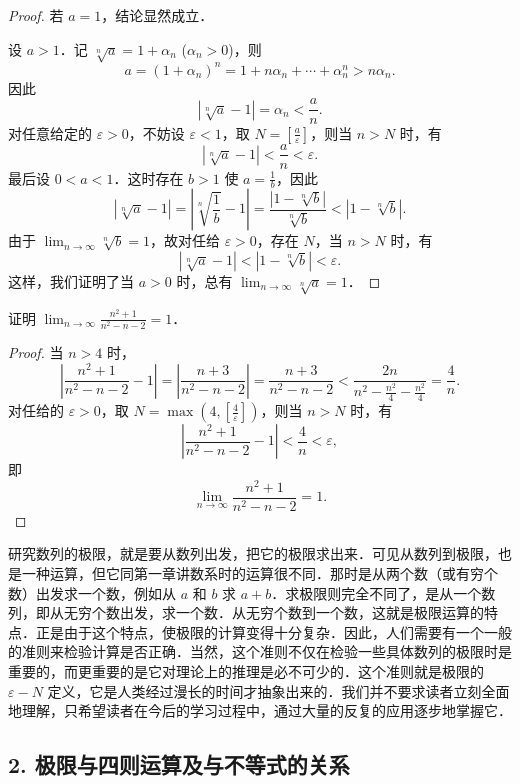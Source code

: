\begin{proof}
若 $a=1$，结论显然成立．

设 $a > 1$．记 $\sqrt[n]{a} = 1 + \alpha_n$ ($\alpha_n > 0$)，则
\[
a = (1 + \alpha_n)^n = 1 + n\alpha_n + \cdots + \alpha_n^n > n\alpha_n.
\]
因此
\[
|\sqrt[n]{a} - 1| = \alpha_n < \frac{a}{n}.
\]
对任意给定的 $\varepsilon>0$，不妨设 $\varepsilon<1$，取 $N = \left[\frac{a}{\varepsilon}\right]$，则当 $n>N$ 时，有
\[
|\sqrt[n]{a} - 1| < \frac{a}{n} < \varepsilon.
\]
最后设 $0 < a < 1$．这时存在 $b > 1$ 使 $a = \frac{1}{b}$，因此
\[
|\sqrt[n]{a} - 1| = \left|\sqrt[n]{\frac{1}{b}} - 1\right| = \frac{|1 - \sqrt[n]{b}|}{\sqrt[n]{b}} < |1 - \sqrt[n]{b}|.
\]
由于 $\lim_{n\to\infty}\sqrt[n]{b} = 1$，故对任给 $\varepsilon>0$，存在 $N$，当 $n>N$ 时，有
\[
|\sqrt[n]{a} - 1| < |1 - \sqrt[n]{b}| < \varepsilon.
\]
这样，我们证明了当 $a > 0$ 时，总有 $\lim_{n \to \infty} \sqrt[n]{a} = 1$．
\end{proof}

\begin{example}\label{ex:3-2-9}
证明 $\lim_{n\to\infty}\frac{n^2+1}{n^2-n-2} = 1$．
\end{example}

\begin{proof}
当 $n>4$ 时，
\[
\left|\frac{n^2+1}{n^2-n-2} - 1\right| = \left|\frac{n+3}{n^2-n-2}\right| = \frac{n+3}{n^2-n-2} < \frac{2n}{n^2 - \frac{n^2}{4} - \frac{n^2}{4}} = \frac{4}{n}.
\]
对任给的 $\varepsilon>0$，取 $N = \max\left(4, \left[\frac{4}{\varepsilon}\right]\right)$，则当 $n>N$ 时，有
\[
\left|\frac{n^2+1}{n^2-n-2} - 1\right| < \frac{4}{n} < \varepsilon,
\]
即
\[
\lim_{n\to\infty}\frac{n^2+1}{n^2-n-2} = 1.
\]
\end{proof}

研究数列的极限，就是要从数列出发，把它的极限求出来．可见从数列到极限，也是一种运算，但它同第一章讲数系时的运算很不同．那时是从两个数（或有穷个数）出发求一个数，例如从 $a$ 和 $b$ 求 $a+b$．求极限则完全不同了，是从一个数列，即从无穷个数出发，求一个数．从无穷个数到一个数，这就是极限运算的特点．正是由于这个特点，使极限的计算变得十分复杂．因此，人们需要有一个一般的准则来检验计算是否正确．当然，这个准则不仅在检验一些具体数列的极限时是重要的，而更重要的是它对理论上的推理是必不可少的．这个准则就是极限的 $\varepsilon-N$ 定义，它是人类经过漫长的时间才抽象出来的．我们并不要求读者立刻全面地理解，只希望读者在今后的学习过程中，通过大量的反复的应用逐步地掌握它．

\subsection*{2. 极限与四则运算及与不等式的关系}

